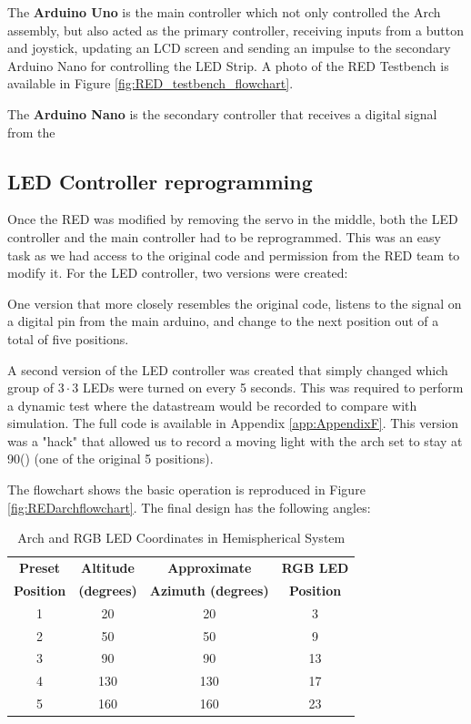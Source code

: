 The \textbf{Arduino Uno} is the main controller which not only controlled the Arch assembly, but also acted as the primary controller, receiving inputs from a button and joystick, updating an LCD screen and sending an impulse to the secondary Arduino Nano for controlling the LED Strip. A photo of the \ac{RED} Testbench is available in Figure \ref{fig:RED_testbench_flowchart}.

The \textbf{Arduino Nano} is the secondary controller that receives a digital signal from the 

\subsection{LED Controller reprogramming}
Once the \ac{RED} was modified by removing the servo in the middle, both the LED controller and the  main controller had to be reprogrammed. This was an easy task as we had access to the original code and permission from the RED \cite{RefWorks:shopov2022renewable} team to modify it. For the LED controller, two versions were created:

One version that more closely resembles the original code, listens to the signal on a digital pin from the main arduino, and change to the next position out of a total of five positions.

A second version of the LED controller was created that simply changed which group of $3 \cdot 3$ LEDs were turned on every 5 seconds. This was required to perform a dynamic test where the datastream would be recorded to compare with simulation. The full code is available in Appendix \ref{app:AppendixF}. This version was a "hack" that allowed us to record a moving light with the arch set to stay at 90\textdegree() (one of the original 5 positions). 

The flowchart shows the basic operation is reproduced in Figure \ref{fig:REDarchflowchart}. The final design has the following angles:

  \begin{table}[htbp]
    \centering
    \caption{Arch and RGB LED Coordinates in Hemispherical System}
    \begin{tabular}{|c|c|c|c|}
    \hline
    \textbf{Preset} & \textbf{Altitude} & \textbf{Approximate} & \textbf{RGB LED} \\
    \textbf{Position} & \textbf{(degrees)} & \textbf{Azimuth (degrees)} & \textbf{Position} \\
    \hline
    1 & 20 & 20 & 3 \\
    \hline
    2 & 50 & 50 & 9 \\
    \hline
    3 & 90 & 90 & 13 \\
    \hline
    4 & 130 & 130 & 17 \\
    \hline
    5 & 160 & 160 & 23 \\
    \hline
    \end{tabular}
    \label{tab:arch-led-positions}
\end{table}


